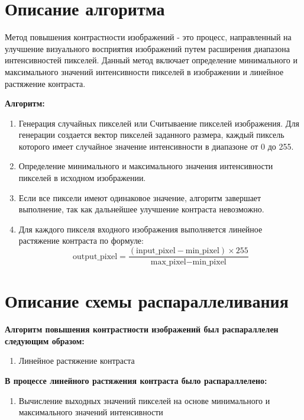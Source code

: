 \documentclass{report}
\begin{document}
\section*{Описание алгоритма}
\par Метод повышения контрастности изображений - это процесс, направленный на улучшение визуального восприятия изображений путем расширения диапазона интенсивностей пикселей. Данный метод включает определение минимального и максимального значений интенсивности пикселей в изображении и линейное растяжение контраста.

\par \textbf{Алгоритм:}

\begin{enumerate}
\item Генерация случайных пикселей или Считываение пикселей изображения. Для генерации создается вектор пикселей заданного размера, каждый пиксель которого имеет случайное значение интенсивности в диапазоне от 0 до 255.
\item Определение минимального и максимального значения интенсивности пикселей в исходном изображении.
\item Если все пиксели имеют одинаковое значение, алгоритм завершает выполнение, так как дальнейшее улучшение контраста невозможно.
\item Для каждого пикселя входного изображения выполняется линейное растяжение контраста по формуле:
\[ \text{output\_pixel} = \frac{(\text{input\_pixel} - \text{min\_pixel}) \times 255}{\text{max\_pixel} - \text{min\_pixel}} \]
\end{enumerate}

\newpage

\section* {Описание схемы распараллеливания}
\par \textbf{Алгоритм повышения контрастности изображений был распараллелен следующим образом:}
\begin{enumerate}
\item Линейное растяжение контраста
\end{enumerate}
\vspace{1em}
\par \textbf{В процессе линейного растяжения контраста было распараллелено:}
\begin{enumerate}
\item Вычисление выходных значений пикселей на основе минимального и максимального значений интенсивности
\end{enumerate}
\end{document}
